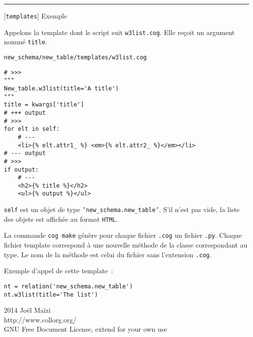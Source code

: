 \documentclass[a4paper]{letter}
\newcommand{\subsection}[2]{
\rule{0.5cm}{0.1pt} {\scriptsize [{#1}]} {#2}
}
\newcommand{\templates}{\texttt{templates}}
\begin{document}
\begin{multicols}{3}
\subsection{\templates}{Exemple}


Appelons la template dont le script suit \texttt{w3list.cog}. Elle reçoit un argument nommé \texttt{title}.

\begin{scriptsize}
\texttt{new\_schema/new\_table/templates/w3list.cog}
\end{scriptsize}

\begin{scriptsize}
\begin{verbatim}
# >>>
"""
New_table.w3list(title='A title')
"""
title = kwargs['title']
# +++ output
# >>>
for elt in self:
    # ---
    <li>{% elt.attr1_ %} <em>{% elt.attr2_ %}</em></li>
# --- output
# >>>
if output:
    # ---
    <h2>{% title %}</h2>
    <ul>{% output %}</ul>
\end{verbatim}
\end{scriptsize}

\texttt{self} est un objet de type \texttt{'new\_schema.new\_table'}. S'il n'est pas vide, la liste des objets est affichée au format \texttt{HTML}.

La commande \texttt{cog make} génère pour chaque fichier \texttt{.cog} un fichier \texttt{.py}. Chaque fichier template correspond à une nouvelle méthode de la classe correspondant au type. Le nom de la méthode est celui du fichier sans l'extension \texttt{.cog}.

Exemple d'appel de cette template~:
\begin{scriptsize}
\begin{verbatim}
nt = relation('new_schema.new_table')
nt.w3list(title='The list')
\end{verbatim}
\end{scriptsize}


\hrulefill
\begin{scriptsize}
2014 Joël Maïzi\\
http://www.collorg.org/\\
GNU Free Document License, extend for your own use
\end{scriptsize}

\begin{scriptsize}
\begin{verbatim}
\end{verbatim}
\end{scriptsize}




\newpage
\end{multicols}
\end{document}
